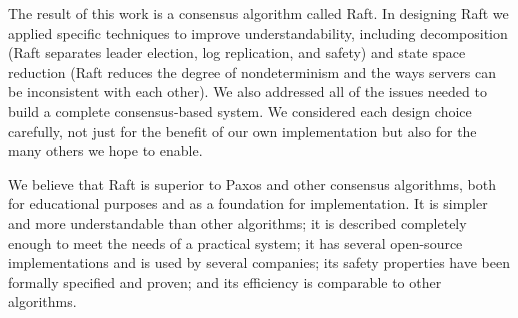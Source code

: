 The result of this work is a consensus algorithm called Raft. In
designing Raft we applied specific techniques to improve
understandability, including decomposition (Raft separates leader
election, log replication, and safety) and state space reduction (Raft
reduces the degree of nondeterminism and the ways servers can be
inconsistent with each other). We also addressed all of the issues needed to
build a complete consensus-based system. We considered each design
choice carefully, not just for the benefit of our own implementation but
also for the many others we hope to enable.

We believe that Raft is superior to Paxos and other consensus
algorithms, both for educational purposes and as a foundation for
implementation. It is simpler and more understandable than other
algorithms; it is described completely enough to meet the needs of a
practical system; it has several open-source implementations and is used
by several companies; its safety properties have been formally specified
and proven; and its efficiency is comparable to other algorithms.

